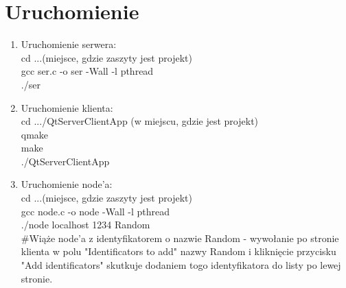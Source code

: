 \documentclass[12pt]{article}
\begin{document}
\section{Uruchomienie}
\begin{enumerate}
	\item Uruchomienie serwera:\\
		cd ...(miejsce, gdzie zaszyty jest projekt)\\
		gcc ser.c -o ser -Wall -l pthread\\
		./ser
	\item Uruchomienie klienta:\\
		cd .../QtServerClientApp (w miejscu, gdzie jest projekt)\\
		qmake\\
		make\\
		./QtServerClientApp
	\item Uruchomienie node'a:\\
	cd ...(miejsce, gdzie zaszyty jest projekt)\\
	gcc node.c -o node -Wall -l pthread\\
	./node localhost 1234 Random\\
	\#Wiąże node'a z identyfikatorem o nazwie Random - wywołanie po stronie klienta w polu "Identificators to add" nazwy Random i kliknięcie przycisku "Add identificators" skutkuje dodaniem togo identyfikatora do listy po lewej stronie.
		
\end{enumerate}
\end{document}

